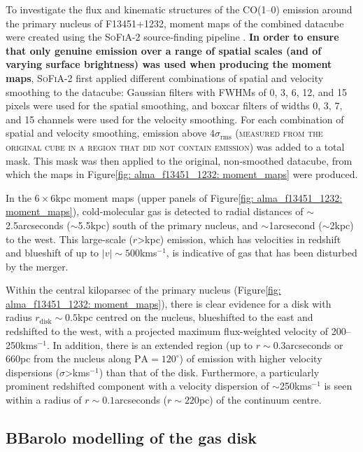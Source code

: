 To investigate the flux and kinematic structures of the CO(1--0) emission around the primary nucleus of F13451+1232, moment maps of the combined datacube were created using the \textsc{SoFiA-2} source-finding pipeline \citep{Serra2015, Serra2021}. \textbf{In order to ensure that only genuine emission over a range of spatial scales (and of varying surface brightness) was used when producing the moment maps}, \textsc{SoFiA-2} first applied different combinations of spatial and velocity smoothing to the datacube: Gaussian filters with FWHMs of 0, 3, 6, 12, and 15 pixels were used for the spatial smoothing, and boxcar filters of widths 0, 3, 7, and 15 channels were used for the velocity smoothing. For each combination of spatial and velocity smoothing, emission above $4\sigma_\mathrm{rms}$ \textsc{(measured from the original cube in a region that did not contain emission)} was added to a total mask. This mask was then applied to the original, non-smoothed datacube, from which the maps in Figure\;\ref{fig: alma_f13451_1232: moment_maps} were produced. 

In the $6\times6$\;kpc moment maps (upper panels of Figure\;\ref{fig: alma_f13451_1232: moment_maps}), cold-molecular gas is detected to radial distances of $\sim$2.5\;arcseconds ($\sim$5.5\;kpc) south of the primary nucleus, and $\sim$1\;arcsecond ($\sim$2\;kpc) to the west. This large-scale ($r$\;\textgreater{}\;kpc) emission, which has velocities in redshift and blueshift of up to $|v|\sim500$\;km\;s$^{-1}$, is indicative of gas that has been disturbed by the merger.

Within the central kiloparsec of the primary nucleus (Figure\;\ref{fig: alma_f13451_1232: moment_maps}), there is clear evidence for a disk with radius $r_\mathrm{disk}\sim0.5$\;kpc centred on the nucleus, blueshifted to the east and redshifted to the west, with a projected maximum flux-weighted velocity of 200--250\;km\;s$^{-1}$. In addition, there is an extended region (up to $r\sim0.3$\;arcseconds or 660\;pc from the nucleus along $\mathrm{PA}=120^\circ$) of emission with higher velocity dispersions ($\sigma$\;\textgreater{}\;km\;s$^{-1}$) than that of the disk. Furthermore, a particularly prominent redshifted component with a velocity dispersion of $\sim$250\;km\;s$^{-1}$ is seen within a radius of $r\sim0.1$\;arcseconds ($r\sim220$\;pc) of the continuum centre.


\subsection{BBarolo modelling of the gas disk}
\label{section: alma_f13451_1232: analysis_and_results: disk}


